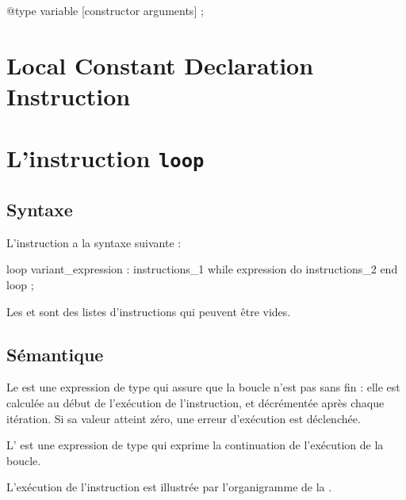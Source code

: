 {
\begin{galgascode}
@type variable [constructor arguments] ;
\end{galgascode}
}


\section{Local Constant Declaration Instruction}








\section{L'instruction \texttt{loop}}


\subsection{Syntaxe}

L'instruction  a la syntaxe suivante :
\begin{galgascode}
loop variant_expression :
  instructions_1
while expression do
  instructions_2
end loop ;  
\end{galgascode}


Les  et  sont des listes d'instructions qui peuvent être vides.

\subsection{Sémantique}

Le  est une expression de type  qui assure que la boucle n'est pas sans fin : elle est calculée au début de l'exécution de l'instruction, et décrémentée après chaque itération. Si sa valeur atteint zéro, une erreur d'exécution est déclenchée.

L' est une expression de type  qui exprime la continuation de l'exécution de la boucle.

L'exécution de l'instruction  est illustrée par l'organigramme de la .



